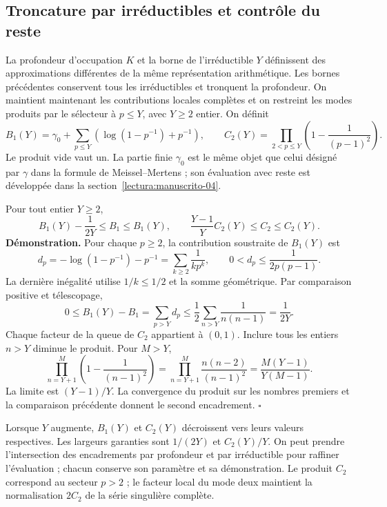 \subsection{Troncature par irréductibles et contrôle du reste}
\label{ix-add:corte-primos}

La profondeur d'occupation $K$ et la borne de l'irréductible $Y$ définissent
des approximations différentes de la même représentation arithmétique. Les bornes
précédentes conservent tous les irréductibles et tronquent la profondeur. On
maintient maintenant les contributions locales complètes et on restreint les modes
produits par le sélecteur à $p\leq Y$, avec $Y\geq2$ entier. On définit
\[
 B_1(Y)=\gamma_0+\sum_{p\leq Y}
       \left(\log(1-p^{-1})+p^{-1}\right),\qquad
 C_2(Y)=\prod_{2<p\leq Y}\left(1-\frac1{(p-1)^2}\right).
\]
Le produit vide vaut un. La partie finie $\gamma_0$ est le même objet que celui désigné par $\gamma$ dans la formule de Meissel--Mertens ; son évaluation avec reste est développée dans la section~\ref{lectura:manuscrito-04}.

Pour tout entier $Y\geq2$,
\[
 B_1(Y)-\frac1{2Y}\leq B_1\leq B_1(Y),\qquad
 \frac{Y-1}{Y}C_2(Y)\leq C_2\leq C_2(Y).
\]
\textbf{Démonstration.}
Pour chaque $p\geq2$, la contribution soustraite de $B_1(Y)$ est
\[
 d_p=-\log(1-p^{-1})-p^{-1}
     =\sum_{k\geq2}\frac1{kp^k},\qquad
 0<d_p\leq\frac1{2p(p-1)}.
\]
La dernière inégalité utilise $1/k\leq1/2$ et la somme géométrique. Par comparaison positive et télescopage,
\[
 0\leq B_1(Y)-B_1=\sum_{p>Y}d_p
 \leq\frac12\sum_{n>Y}\frac1{n(n-1)}=\frac1{2Y}.
\]
Chaque facteur de la queue de $C_2$ appartient à $(0,1)$. Inclure tous les
entiers $n>Y$ diminue le produit. Pour $M>Y$,
\[
 \prod_{n=Y+1}^{M}\left(1-\frac1{(n-1)^2}\right)
 =\prod_{n=Y+1}^{M}\frac{n(n-2)}{(n-1)^2}
 =\frac{M(Y-1)}{Y(M-1)}.
\]
La limite est $(Y-1)/Y$. La convergence du produit sur les nombres premiers et la comparaison précédente donnent le second encadrement. \hfill$\square$

Lorsque $Y$ augmente, $B_1(Y)$ et $C_2(Y)$ décroissent vers leurs valeurs respectives.
Les largeurs garanties sont $1/(2Y)$ et $C_2(Y)/Y$. On peut prendre l'intersection des encadrements par
profondeur et par irréductible pour raffiner l'évaluation ;
chacun conserve son paramètre et sa démonstration. Le produit $C_2$
correspond au secteur $p>2$ ; le facteur local du mode deux maintient la
normalisation $2C_2$ de la série singulière complète.

